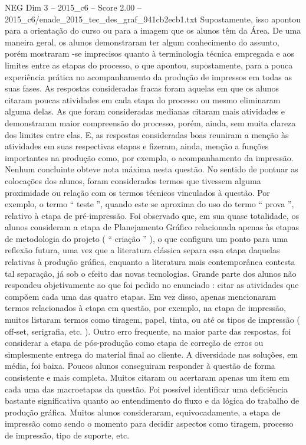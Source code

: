 \begin{textsample}{NEG Dim 3 – 2015\_c6 – Score 2.00 – 2015\_c6/enade\_2015\_tec\_des\_graf\_941cb2ecb1.txt}
Supostamente, isso apontou para a orientação do curso ou para a imagem que os alunos têm da Área.
De uma maneira geral, os alunos demonstraram ter algum conhecimento do assunto, porém mostraram -se imprecisos quanto à terminologia técnica empregada e aos limites entre as etapas do processo, o que apontou, supostamente, para a pouca experiência prática no acompanhamento da produção de impressos em todas as suas fases.
As respostas consideradas fracas foram aquelas em que os alunos citaram poucas atividades em cada etapa do processo ou mesmo eliminaram alguma delas.
As que foram consideradas medianas citaram mais atividades e demonstraram maior compreensão do processo, porém, ainda, sem muita clareza dos limites entre elas.
E, as respostas consideradas boas reuniram a menção às atividades em suas respectivas etapas e fizeram, ainda, menção a funções importantes na produção como, por exemplo, o acompanhamento da impressão.
Nenhum concluinte obteve nota máxima nesta questão.
No sentido de pontuar as colocações dos alunos, foram considerados termos que tivessem alguma proximidade ou relação com os termos técnicos vinculados à questão.
Por exemplo, o termo “ teste ”, quando este se aproxima do uso do termo “ prova ”, relativo à etapa de pré-impressão.
Foi observado que, em sua quase totalidade, os alunos consideram a etapa de Planejamento Gráfico relacionada apenas às etapas de metodologia do projeto ( “ criação ” ), o que configura um ponto para uma reflexão futura, uma vez que a literatura clássica separa essa etapa daquelas relativas à produção gráfica, enquanto a literatura mais contemporânea contesta tal separação, já sob o efeito das novas tecnologias.
Grande parte dos alunos não respondeu objetivamente ao que foi pedido no enunciado : citar as atividades que compõem cada uma das quatro etapas.
Em vez disso, apenas mencionaram termos relacionados à etapa em questão, por exemplo, na etapa de impressão, muitos listaram termos como tiragem, papel, tinta, ou até os tipos de impressão ( off-set, serigrafia, etc. ).
Outro erro frequente, na maior parte das respostas, foi considerar a etapa de pós-produção como etapa de correção de erros ou simplesmente entrega do material final ao cliente.
A diversidade nas soluções, em média, foi baixa.
Poucos alunos conseguiram responder à questão de forma consistente e mais completa.
Muitos citaram ou acertaram apenas um item em cada uma das macroetapas da questão.
Foi possível identificar uma deficiência bastante significativa quanto ao entendimento do fluxo e da lógica do trabalho de produção gráfica.
Muitos alunos consideraram, equivocadamente, a etapa de impressão como sendo o momento para decidir aspectos como tiragem, processo de impressão, tipo de suporte, etc.

\end{textsample}
